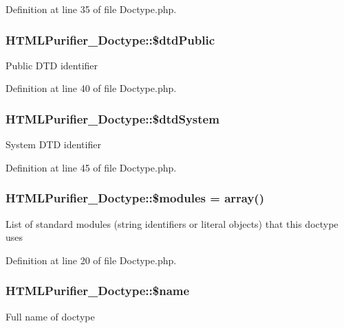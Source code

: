 Definition at line 35 of file Doctype.\+php.

\hypertarget{classHTMLPurifier__Doctype_a7c09accf36f15025fb9eacdd7d3034e9}{
\subsubsection[{\$dtd\+Public}]{\setlength{\rightskip}{0pt plus 5cm}H\+T\+M\+L\+Purifier\+\_\+\+Doctype\+::\$dtd\+Public}}\label{classHTMLPurifier__Doctype_a7c09accf36f15025fb9eacdd7d3034e9}
Public D\+T\+D identifier 

Definition at line 40 of file Doctype.\+php.

\hypertarget{classHTMLPurifier__Doctype_a06deda0ab96e03bb9fa4dff3c4b28522}{
\subsubsection[{\$dtd\+System}]{\setlength{\rightskip}{0pt plus 5cm}H\+T\+M\+L\+Purifier\+\_\+\+Doctype\+::\$dtd\+System}}\label{classHTMLPurifier__Doctype_a06deda0ab96e03bb9fa4dff3c4b28522}
System D\+T\+D identifier 

Definition at line 45 of file Doctype.\+php.

\hypertarget{classHTMLPurifier__Doctype_ac02f91aa55c131c0d047a8e919851eaf}{
\subsubsection[{\$modules}]{\setlength{\rightskip}{0pt plus 5cm}H\+T\+M\+L\+Purifier\+\_\+\+Doctype\+::\$modules = array()}}\label{classHTMLPurifier__Doctype_ac02f91aa55c131c0d047a8e919851eaf}
List of standard modules (string identifiers or literal objects) that this doctype uses 

Definition at line 20 of file Doctype.\+php.

\hypertarget{classHTMLPurifier__Doctype_ab1bbc91b5d4bea664707ceb5a21fb80e}{
\subsubsection[{\$name}]{\setlength{\rightskip}{0pt plus 5cm}H\+T\+M\+L\+Purifier\+\_\+\+Doctype\+::\$name}}\label{classHTMLPurifier__Doctype_ab1bbc91b5d4bea664707ceb5a21fb80e}
Full name of doctype 

